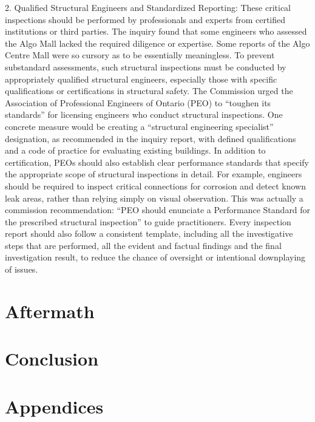 \documentclass[12pt]{article}
\begin{document}
2. Qualified Structural Engineers and Standardized Reporting: These critical inspections should be performed by professionals and experts from certified institutions or third parties. The inquiry found that some engineers who assessed the Algo Mall lacked the required diligence or expertise. Some reports of the Algo Centre Mall were so cursory as to be essentially meaningless. To prevent substandard assessments, such structural inspections must be conducted by appropriately qualified structural engineers, especially those with specific qualifications or certifications in structural safety. The Commission urged the Association of Professional Engineers of Ontario (PEO) to “toughen its standards” for licensing engineers who conduct structural inspections. One concrete measure would be creating a “structural engineering specialist” designation, as recommended in the inquiry report, with defined qualifications and a code of practice for evaluating existing buildings. In addition to certification, PEOs should also establish clear performance standards that specify the appropriate scope of structural inspections in detail. For example, engineers should be required to inspect critical connections for corrosion and detect known leak areas, rather than relying simply on visual observation. This was actually a commission recommendation: “PEO should enunciate a Performance Standard for the prescribed structural inspection” to guide practitioners. Every inspection report should also follow a consistent template, including all the investigative steps that are performed, all the evident and factual findings and the final investigation result, to reduce the chance of oversight or intentional downplaying of issues.




\section{Aftermath}

\section{Conclusion}


\section*{Appendices}

\newpage
\printbibliography
\end{document}
